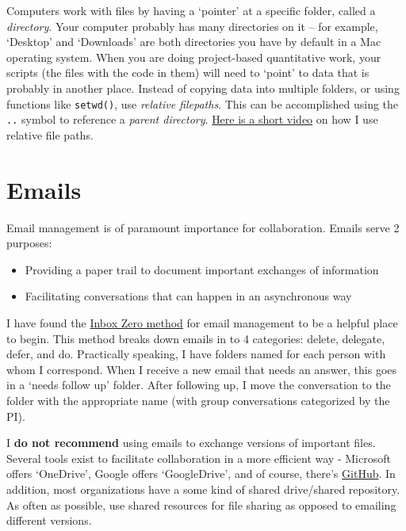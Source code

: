 \documentclass[
]{book}
\begin{document}
Computers work with files by having a `pointer' at a specific folder, called a \emph{directory}. Your computer probably has many directories on it -- for example, `Desktop' and `Downloads' are both directories you have by default in a Mac operating system. When you are doing project-based quantitative work, your scripts (the files with the code in them) will need to `point' to data that is probably in another place. Instead of copying data into multiple folders, or using functions like \texttt{setwd()}, use \emph{relative filepaths}. This can be accomplished using the \texttt{..} symbol to reference a \emph{parent directory}. \href{https://youtu.be/eb11iggmuwM}{Here is a short video} on how I use relative file paths.

\hypertarget{emails}{%
\section{Emails}\label{emails}}

Email management is of paramount importance for collaboration. Emails serve 2 purposes:

\begin{itemize}
\item
  Providing a paper trail to document important exchanges of information
\item
  Facilitating conversations that can happen in an asynchronous way
\end{itemize}

I have found the \href{https://hive.com/blog/inbox-zero/}{Inbox Zero method} for email management to be a helpful place to begin. This method breaks down emails in to 4 categories: delete, delegate, defer, and do. Practically speaking, I have folders named for each person with whom I correspond. When I receive a new email that needs an answer, this goes in a `needs follow up' folder. After following up, I move the conversation to the folder with the appropriate name (with group conversations categorized by the PI).

I \textbf{do not recommend} using emails to exchange versions of important files. Several tools exist to facilitate collaboration in a more efficient way - Microsoft offers `OneDrive', Google offers `GoogleDrive', and of course, there's \href{https://docs.github.com/en/get-started/getting-started-with-git}{GitHub}. In addition, most organizations have a some kind of shared drive/shared repository. As often as possible, use shared resources for file sharing as opposed to emailing different versions.
\end{document}
